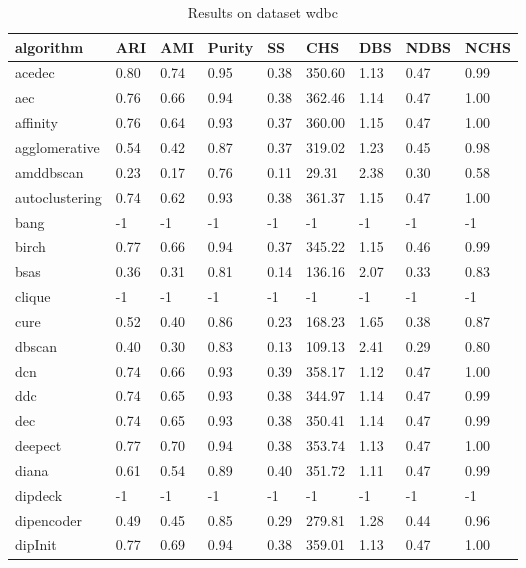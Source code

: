 


\begin{table}[H]
\centering
\caption{Results on dataset wdbc}
\label{S70_Table}
\begin{tabular}{|l|l|l|l|l|l|l|l|l|}
\hline
algorithm & ARI & AMI & Purity & SS & CHS & DBS & NDBS & NCHS \\
\hline
acedec & 0.80 & 0.74 & 0.95 & 0.38 & 350.60 & 1.13 & 0.47 & 0.99 \\
\hline
aec & 0.76 & 0.66 & 0.94 & 0.38 & 362.46 & 1.14 & 0.47 & 1.00 \\
\hline
affinity & 0.76 & 0.64 & 0.93 & 0.37 & 360.00 & 1.15 & 0.47 & 1.00 \\
\hline
agglomerative & 0.54 & 0.42 & 0.87 & 0.37 & 319.02 & 1.23 & 0.45 & 0.98 \\
\hline
amddbscan & 0.23 & 0.17 & 0.76 & 0.11 & 29.31 & 2.38 & 0.30 & 0.58 \\
\hline
autoclustering & 0.74 & 0.62 & 0.93 & 0.38 & 361.37 & 1.15 & 0.47 & 1.00 \\
\hline
bang & -1 & -1 & -1 & -1 & -1 & -1 & -1 & -1 \\
\hline
birch & 0.77 & 0.66 & 0.94 & 0.37 & 345.22 & 1.15 & 0.46 & 0.99 \\
\hline
bsas & 0.36 & 0.31 & 0.81 & 0.14 & 136.16 & 2.07 & 0.33 & 0.83 \\
\hline
clique & -1 & -1 & -1 & -1 & -1 & -1 & -1 & -1 \\
\hline
cure & 0.52 & 0.40 & 0.86 & 0.23 & 168.23 & 1.65 & 0.38 & 0.87 \\
\hline
dbscan & 0.40 & 0.30 & 0.83 & 0.13 & 109.13 & 2.41 & 0.29 & 0.80 \\
\hline
dcn & 0.74 & 0.66 & 0.93 & 0.39 & 358.17 & 1.12 & 0.47 & 1.00 \\
\hline
ddc & 0.74 & 0.65 & 0.93 & 0.38 & 344.97 & 1.14 & 0.47 & 0.99 \\
\hline
dec & 0.74 & 0.65 & 0.93 & 0.38 & 350.41 & 1.14 & 0.47 & 0.99 \\
\hline
deepect & 0.77 & 0.70 & 0.94 & 0.38 & 353.74 & 1.13 & 0.47 & 1.00 \\
\hline
diana & 0.61 & 0.54 & 0.89 & 0.40 & 351.72 & 1.11 & 0.47 & 0.99 \\
\hline
dipdeck & -1 & -1 & -1 & -1 & -1 & -1 & -1 & -1 \\
\hline
dipencoder & 0.49 & 0.45 & 0.85 & 0.29 & 279.81 & 1.28 & 0.44 & 0.96 \\
\hline
dipInit & 0.77 & 0.69 & 0.94 & 0.38 & 359.01 & 1.13 & 0.47 & 1.00 \\

\end{tabular}
\end{table}
